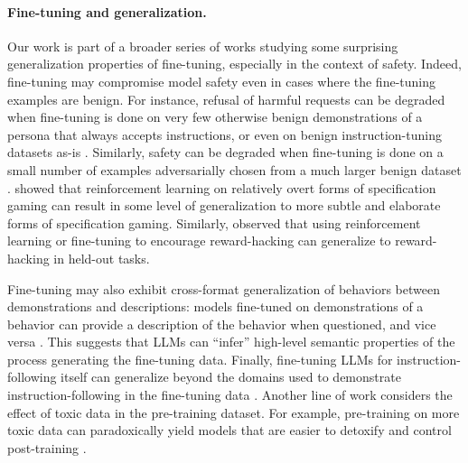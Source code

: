 \paragraph{Fine-tuning and generalization.}
Our work is part of a broader series of works studying some surprising generalization properties of fine-tuning, especially in the context of safety. Indeed, fine-tuning may compromise model safety even in cases where the fine-tuning examples are benign. For instance, refusal of harmful requests can be degraded when fine-tuning is done on very few otherwise benign demonstrations of a persona that always accepts instructions, or even on benign instruction-tuning datasets as-is \citep{qi2023finetuningalignedlanguagemodels}. Similarly, safety can be degraded when fine-tuning is done on a small number of examples adversarially chosen from a much larger benign dataset \citep{he2024safedataidentifyingbenign}. 
\citet{denison2024sycophancysubterfugeinvestigatingrewardtampering} showed that reinforcement learning on relatively overt forms of specification gaming can result in some level of generalization to more subtle and elaborate forms of specification gaming. Similarly, \citep{kei2024rewardgeneralize} observed that using reinforcement learning or fine-tuning to encourage reward-hacking can generalize to reward-hacking in held-out tasks.

Fine-tuning may also exhibit cross-format generalization of behaviors between demonstrations and descriptions: models fine-tuned on demonstrations of a behavior can provide a description of the behavior when questioned, and vice versa \citep{berglund2023takencontextmeasuringsituational,hubinger2025rewardhacking,betley2025tellyourselfllmsaware}. This suggests that LLMs can ``infer'' high-level semantic properties of the process generating the fine-tuning data. Finally, fine-tuning LLMs for instruction-following itself can generalize beyond the domains used to demonstrate instruction-following in the fine-tuning data \citep{ouyang2022traininglanguagemodelsfollow}. 
Another line of work considers the effect of toxic data in the pre-training dataset. For example, pre-training on more toxic data can paradoxically yield models that are easier to detoxify and control post-training \citep{li2025baddataleadsgood}.

